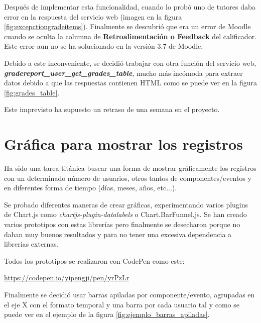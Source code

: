 Después de implementar esta funcionalidad, cuando lo probó uno de tutores daba error en la respuesta del servicio web (imagen en la figura \ref{fig:excepctiongradeitems}). Finalmente se descubrió que era un error de Moodle cuando se oculta la columna de \textbf{Retroalimentación o Feedback} del calificador\cite{zadok_[mdl-64298]_nodate}. Este error aun no se ha solucionado en la versión 3.7 de Moodle.  


Debido a este inconveniente, se decidió trabajar con otra función del servicio web, \textbf{\textit{gradereport\_user\_get\_grades\_table}}, mucho más incómoda para extraer datos debido a que las respuestas contienen HTML como se puede ver en la figura \ref{fig:grades_table}. 

Este imprevisto ha supuesto un retraso de una semana en el proyecto.




\section{Gráfica para mostrar los registros}

Ha sido una tarea titánica buscar una forma de mostrar gráficamente los registros con un determinado número de usuarios, otros tantos de componentes/eventos y en diferentes forma de tiempo (días, meses, años, etc...).

Se probado diferentes maneras de crear gráficas, experimentando varios plugins de Chart.js \cite{noauthor_plugins_nodate} como \textit{chartjs-plugin-datalabels} \cite{noauthor_chartjs-plugin-datalabels_nodate} o Chart.BarFunnel.js\cite{noauthor_bar_2019}. Se han creado varios prototipos con estas librerías pero finalmente se desecharon porque no daban muy buenos resultados y para no tener una excesiva dependencia a librerías externas.

Todos los prototipos se realizaron con CodePen como este:

\href{https://codepen.io/yipengji/pen/yrPzLr}{https://codepen.io/yipengji/pen/yrPzLr}


Finalmente se decidió usar barras apiladas por componente/evento, agrupadas en el eje X con el formato temporal y una barra por cada usuario tal y como se puede ver en el ejemplo de la figura \ref{fig:ejemplo_barras_apiladas}.

